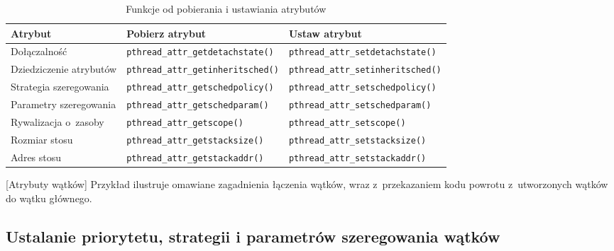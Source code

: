 \begin{table}[h!]
\centering
\caption{Funkcje od pobierania i ustawiania atrybutów}
\setlength{\arrayrulewidth}{1pt}
\setlength{\tabcolsep}{6pt}
\renewcommand{\arraystretch}{1.2}
\begin{tabular}{ |p{}|p{}|p{}| }
\hline \rowcolor{gray}
\textbf{Atrybut} & \textbf{Pobierz atrybut} & \textbf{Ustaw atrybut} \\ \hline
Dołączalność & \mbox{\lstinline[style=MyCStyle]{pthread_attr_getdetachstate()}} & \mbox{\lstinline[style=MyCStyle]{pthread_attr_setdetachstate()}} \\ \hline 
Dziedziczenie atrybutów & \mbox{\lstinline[style=MyCStyle]{pthread_attr_getinheritsched()}} & \mbox{\lstinline[style=MyCStyle]{pthread_attr_setinheritsched()}} \\ \hline 
Strategia szeregowania & \mbox{\lstinline[style=MyCStyle]{pthread_attr_getschedpolicy()}} & \mbox{\lstinline[style=MyCStyle]{pthread_attr_setschedpolicy()}} \\ \hline 
Parametry szeregowania & \mbox{\lstinline[style=MyCStyle]{pthread_attr_getschedparam()}} & \mbox{\lstinline[style=MyCStyle]{pthread_attr_setschedparam()}} \\ \hline 
Rywalizacja o~zasoby & \mbox{\lstinline[style=MyCStyle]{pthread_attr_getscope()}} & \mbox{\lstinline[style=MyCStyle]{pthread_attr_setscope()}} \\ \hline 
Rozmiar stosu & \mbox{\lstinline[style=MyCStyle]{pthread_attr_getstacksize()}} & \mbox{\lstinline[style=MyCStyle]{pthread_attr_setstacksize()}} \\ \hline 
Adres stosu & \mbox{\lstinline[style=MyCStyle]{pthread_attr_getstackaddr()}} & \mbox{\lstinline[style=MyCStyle]{pthread_attr_setstackaddr()}} \\ \hline 
\end{tabular}
\label{tab:atrybuty2}
\end{table}


\begin{example}{[Atrybuty wątków]}
Przykład ilustruje omawiane zagadnienia łączenia wątków, wraz z~przekazaniem kodu powrotu z~utworzonych wątków do wątku głównego. 


\end{example} 

\subsection{Ustalanie priorytetu, strategii i parametrów szeregowania wątków}


